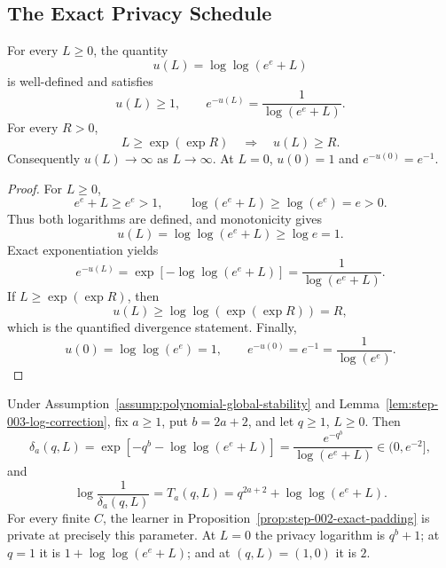 \subsection{The Exact Privacy Schedule}\label{app:privacy-schedule}

\begin{lemma}\label{lem:step-003-log-correction}
For every \(L\geq0\), the quantity
\[
u(L)=\log\log(e^e+L)
\]
is well-defined and satisfies
\[
u(L)\geq1,\qquad
e^{-u(L)}=\frac1{\log(e^e+L)}.
\tag{A.35}
\]
For every \(R>0\),
\[
L\geq\exp(\exp R)\quad\Longrightarrow\quad u(L)\geq R.
\tag{A.36}
\]
Consequently \(u(L)\to\infty\) as \(L\to\infty\).  At \(L=0\),
\(u(0)=1\) and \(e^{-u(0)}=e^{-1}\).
\end{lemma}

\begin{proof}
For \(L\geq0\),
\[
e^e+L\geq e^e>1,\qquad
\log(e^e+L)\geq\log(e^e)=e>0.
\tag{A.37}
\]
Thus both logarithms are defined, and monotonicity gives
\[
u(L)=\log\log(e^e+L)\geq\log e=1.
\tag{A.38}
\]
Exact exponentiation yields
\[
e^{-u(L)}
=\exp[-\log\log(e^e+L)]
=\frac1{\log(e^e+L)}.
\tag{A.39}
\]
If \(L\geq\exp(\exp R)\), then
\[
u(L)\geq
\log\log(\exp(\exp R))=R,
\tag{A.40}
\]
which is the quantified divergence statement.  Finally,
\[
u(0)=\log\log(e^e)=1,\qquad
e^{-u(0)}=e^{-1}=\frac1{\log(e^e)}.
\tag{A.41}
\]
\end{proof}

\begin{proposition}\label{prop:step-003-exact-privacy-schedule}
Under Assumption~\ref{assump:polynomial-global-stability} and
Lemma~\ref{lem:step-003-log-correction}, fix \(a\geq1\), put
\(b=2a+2\), and let \(q\geq1\), \(L\geq0\).  Then
\[
\delta_a(q,L)
=\exp[-q^b-\log\log(e^e+L)]
=\frac{e^{-q^b}}{\log(e^e+L)}
\in(0,e^{-2}],
\tag{A.42}
\]
and
\[
\log\frac1{\delta_a(q,L)}
=T_a(q,L)
=q^{2a+2}+\log\log(e^e+L).
\tag{A.43}
\]
For every finite \(C\), the learner in
Proposition~\ref{prop:step-002-exact-padding} is private at precisely
this parameter.  At \(L=0\) the privacy logarithm is \(q^b+1\); at
\(q=1\) it is \(1+\log\log(e^e+L)\); and at \((q,L)=(1,0)\) it is
\(2\).
\end{proposition}

